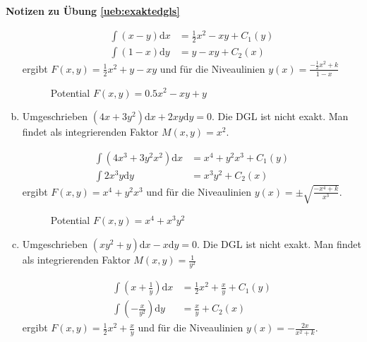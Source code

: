 \documentclass[%
11pt,%
twoside,%
titlepage,%
swissgerman,%
headsepline%
]{scrartcl}
\newcommand{\faReturnGray}{\textcolor{gray}{\faMailReply}} %
\theoremstyle{definition}
\theoremstyle{plain}
\newcommand{\concatueb}[1]{ueb:#1}%
\newcommand{\concatlsg}[1]{lsg:#1}%
\newenvironment{lsg}[1]{%
    \par\noindent\textbf{Notizen zu Übung \ref{\concatueb{#1}}}\label{\concatlsg{#1}}
    \hfill\hyperref[\concatueb{#1}]{\faReturnGray}\par %
}{%
    \par%
}
\begin{document}
\begin{lsg}{exaktedgls}
\begin{enumerate}[a)]
        \begin{align*}
            \int (x-y)\mathrm{d}x &= \frac{1}{2}x^2-xy+C_1(y)\\
            \int (1-x)\mathrm{d}y &= y-xy+C_2(x)
        \end{align*}
        ergibt $F(x,y)=\frac{1}{2}x^2+y-xy$ und für die Niveaulinien $y(x)=\frac{-\frac{1}{2}x^2+k}{1-x}$

        \begin{figure}[h!]
    \centering
    \caption{Potential $F(x,y)=0.5x^2-xy+y$}
    \label{fig:potxyundy}
\end{figure}

        \item Umgeschrieben $(4x+3y^2)\mathrm{d}x+2xy\mathrm{d}y=0$. Die DGL ist nicht exakt. Man findet als integrierenden Faktor $M(x,y)=x^2$.

        \begin{align*}
            \int (4x^3+3y^2x^2)\mathrm{d}x &= x^4+y^2x^3+C_1(y)\\
            \int 2x^3y\mathrm{d}y &= x^3y^2+C_2(x)
        \end{align*}
        ergibt $F(x,y)=x^4+y^2x^3$ und für die Niveaulinien $y(x)=\pm\sqrt{\frac{-x^4+k}{x^3}}$.

        \begin{figure}[h!]
    \centering
    \caption{Potential $F(x,y)=x^4+x^3y^2$}
\end{figure}

        \item Umgeschrieben $(xy^2+y)\mathrm{d}x-x\mathrm{d}y=0$. Die DGL ist nicht exakt. Man findet als integrierenden Faktor $M(x,y)=\frac{1}{y^2}$

        \begin{align*}
            \int (x+\frac{1}{y})\mathrm{d}x &= \frac{1}{2}x^2+\frac{x}{y}+C_1(y)\\
            \int (-\frac{x}{y^2})\mathrm{d}y &= \frac{x}{y}+C_2(x)
        \end{align*}
        ergibt $F(x,y)=\frac{1}{2}x^2+\frac{x}{y}$ und für die Niveaulinien $y(x)=-\frac{2x}{x^2+k}$.


\end{enumerate}
\end{lsg}
\end{document}
